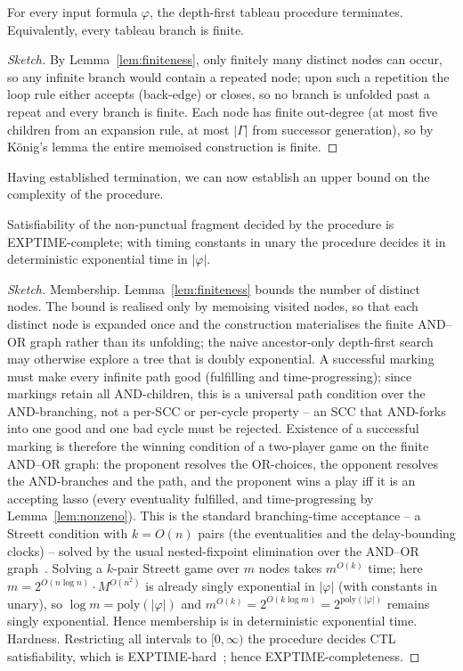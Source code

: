 \begin{theorem}[Termination]\label{thm:termination}
For every input formula $\varphi$, the depth-first tableau procedure terminates.
Equivalently, every tableau branch is finite.
\end{theorem}

\begin{proof}[Sketch]
By Lemma~\ref{lem:finiteness}, only finitely many distinct nodes can occur, so any infinite branch would contain a repeated node; upon such a repetition the loop rule either accepts (back-edge) or closes, so no branch is unfolded past a repeat and every branch is finite. Each node has finite out-degree (at most five children from an expansion rule, at most $|\Gamma|$ from successor generation), so by König's lemma the entire memoised construction is finite.
\end{proof}
\noindent
Having established termination, we can now establish an upper bound on the complexity of the procedure.


\begin{theorem}\label{thm:complexity}
Satisfiability of the non-punctual fragment decided by the procedure is EXPTIME-complete; with timing constants in unary the procedure decides it in deterministic exponential time in $|\varphi|$.
\end{theorem}
\begin{proof}[Sketch]
{Membership.} Lemma~\ref{lem:finiteness} bounds the number of {distinct} nodes. The bound is realised only by {memoising} visited nodes, so that each distinct node is expanded once and the construction materialises the finite AND--OR {graph} rather than its unfolding; the naive ancestor-only depth-first search may otherwise explore a tree that is doubly exponential. A successful marking must make {every} infinite path good (fulfilling and time-progressing); since markings retain {all} AND-children, this is a {universal} path condition over the AND-branching, not a per-SCC or per-cycle property -- an SCC that AND-forks into one good and one bad cycle must be rejected. Existence of a successful marking is therefore the winning condition of a two-player game on the finite AND--OR graph: the proponent resolves the OR-choices, the opponent resolves the AND-branches and the path, and the proponent wins a play iff it is an accepting lasso (every eventuality fulfilled, and time-progressing by Lemma~\ref{lem:nonzeno}). This is the standard branching-time acceptance -- a Streett condition with $k=O(n)$ pairs (the eventualities and the delay-bounding clocks) -- solved by the usual nested-fixpoint elimination over the AND--OR graph~\cite{Clarke99,tableau_ctl}. Solving a $k$-pair Streett game over $m$ nodes takes $m^{O(k)}$ time; here $m=2^{O(n\log n)}\cdot M^{O(n^2)}$ is already singly exponential in $|\varphi|$ (with constants in unary), so $\log m=\mathrm{poly}(|\varphi|)$ and $m^{O(k)}=2^{O(k\log m)}=2^{\mathrm{poly}(|\varphi|)}$ remains singly exponential. Hence membership is in deterministic exponential time.
{Hardness.} Restricting all intervals to $[0,\infty)$ the procedure decides CTL satisfiability, which is EXPTIME-hard~\cite{Clarke99}; hence EXPTIME-completeness.
\end{proof}

